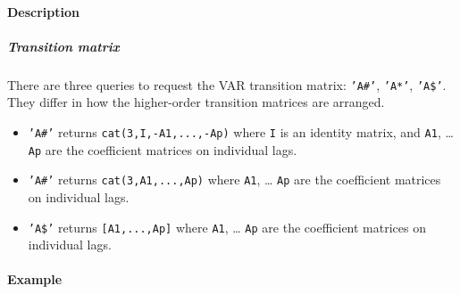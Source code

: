 \paragraph{Description}\label{description}

\subparagraph{Transition matrix}\label{transition-matrix}

There are three queries to request the VAR transition matrix:
\texttt{'A\#'}, \texttt{'A*'}, \texttt{'A\$'}. They differ in how the
higher-order transition matrices are arranged.

\begin{itemize}
\item
  \texttt{'A\#'} returns \texttt{cat(3,I,-A1,...,-Ap)} where \texttt{I}
  is an identity matrix, and \texttt{A1}, \ldots{} \texttt{Ap} are the
  coefficient matrices on individual lags.
\item
  \texttt{'A\#'} returns \texttt{cat(3,A1,...,Ap)} where \texttt{A1},
  \ldots{} \texttt{Ap} are the coefficient matrices on individual lags.
\item
  \texttt{'A\$'} returns \texttt{{[}A1,...,Ap{]}} where \texttt{A1},
  \ldots{} \texttt{Ap} are the coefficient matrices on individual lags.
\end{itemize}

\paragraph{Example}\label{example}


